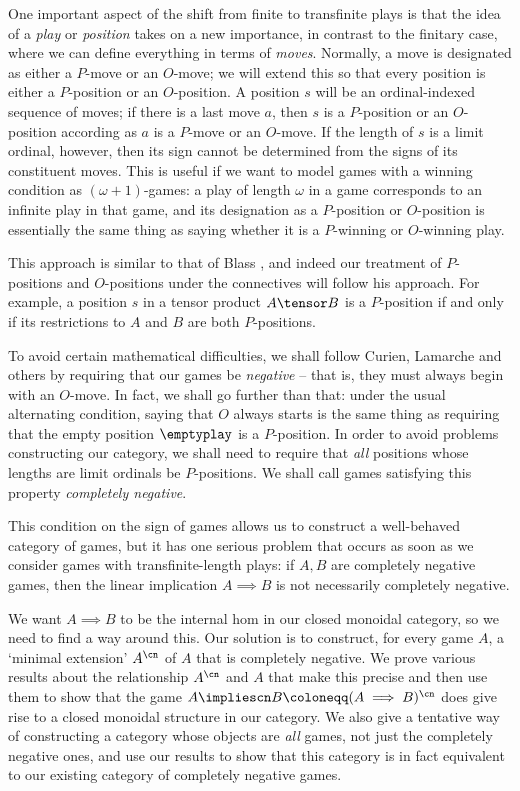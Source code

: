 \documentclass[11pt]{article} %
\begin{document}
One important aspect of the shift from finite to transfinite plays is that the idea of a \emph{play} or \emph{position} takes on a new importance, in contrast to the finitary case, where we can define everything in terms of \emph{moves}.  Normally, a move is designated as either a $P$-move or an $O$-move; we will extend this so that every position is either a $P$-position or an $O$-position.  A position $s$ will be an ordinal-indexed sequence of moves; if there is a last move $a$, then $s$ is a $P$-position or an $O$-position according as $a$ is a $P$-move or an $O$-move.  If the length of $s$ is a limit ordinal, however, then its sign cannot be determined from the signs of its constituent moves.  This is useful if we want to model games with a winning condition as $(\omega+1)$-games: a play of length $\omega$ in a game corresponds to an infinite play in that game, and its designation as a $P$-position or $O$-position is essentially the same thing as saying whether it is a $P$-winning or $O$-winning play.  

This approach is similar to that of Blass \cite{blassgames}, and indeed our treatment of $P$-positions and $O$-positions under the connectives will follow his approach.  For example, a position $s$ in a tensor product $A\tensor B$ is a $P$-position if and only if its restrictions to $A$ and $B$ are both $P$-positions.  

To avoid certain mathematical difficulties, we shall follow Curien, Lamarche and others by requiring that our games be \emph{negative} -- that is, they must always begin with an $O$-move.  In fact, we shall go further than that: under the usual alternating condition, saying that $O$ always starts is the same thing as requiring that the empty position $\emptyplay$ is a $P$-position.  In order to avoid problems constructing our category, we shall need to require that \emph{all} positions whose lengths are limit ordinals be $P$-positions.  We shall call games satisfying this property \emph{completely negative}.

This condition on the sign of games allows us to construct a well-behaved category of games, but it has one serious problem that occurs as soon as we consider games with transfinite-length plays: if $A,B$ are completely negative games, then the linear implication $A\implies B$ is not necessarily completely negative.  

We want $A\implies B$ to be the internal hom in our closed monoidal category, so we need to find a way around this.  Our solution is to construct, for every game $A$, a `minimal extension' $A^{\cn}$ of $A$ that is completely negative.  We prove various results about the relationship $A^{\cn}$ and $A$ that make this precise and then use them to show that the game $A\impliescn B\coloneqq (A\implies B)^{\cn}$ does give rise to a closed monoidal structure in our category.  We also give a tentative way of constructing a category whose objects are \emph{all} games, not just the completely negative ones, and use our results to show that this category is in fact equivalent to our existing category of completely negative games.  
\end{document}
